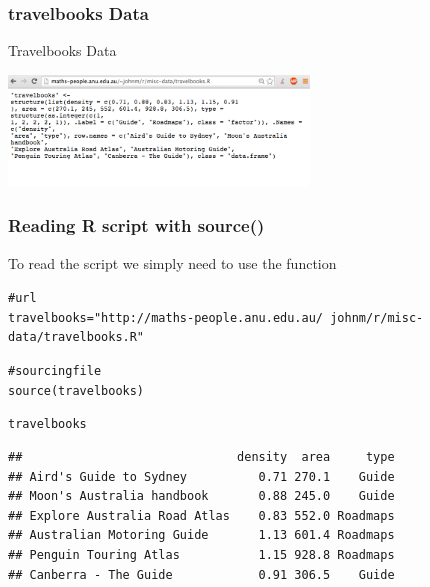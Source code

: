 \documentclass{beamer}\usepackage[]{graphicx}\usepackage[]{color}
\makeatletter
\newcommand{\hlstr}[1]{\textcolor[rgb]{0.063,0.58,0.627}{#1}}%
\newcommand{\hlcom}[1]{\textcolor[rgb]{0.588,0.588,0.588}{#1}}%
\newcommand{\hlstd}[1]{\textcolor[rgb]{0.196,0.196,0.196}{#1}}%
\newcommand{\hlkwb}[1]{\textcolor[rgb]{0.627,0,0.314}{#1}}%
\newcommand{\hlkwd}[1]{\textcolor[rgb]{0.78,0.227,0.412}{#1}}%
\newenvironment{kframe}{%
 \def\at@end@of@kframe{}%
 \ifinner\ifhmode%
  \def\at@end@of@kframe{\end{minipage}}%
  \begin{minipage}{\columnwidth}%
 \fi\fi%
 \def\FrameCommand##1{\hskip\@totalleftmargin \hskip-\fboxsep
 \colorbox{shadecolor}{##1}\hskip-\fboxsep
     \hskip-\linewidth \hskip-\@totalleftmargin \hskip\columnwidth}%
 \MakeFramed {\advance\hsize-\width
   \@totalleftmargin\z@ \linewidth\hsize
   \@setminipage}}%
 {\par\unskip\endMakeFramed%
 \at@end@of@kframe}
\newenvironment{knitrout}{}{} %
\makeatother
\begin{document}

\begin{frame}
\frametitle{travelbooks Data}

Travelbooks Data 
\begin{center}
\includegraphics[width=8cm]{images/travelbooks_data.png}
\end{center}

\end{frame}


\begin{frame}[fragile]
\frametitle{Reading R script with source()}

To read the script we simply need to use the function 
\begin{knitrout}\tiny
{}\color{fgcolor}\begin{kframe}
\begin{alltt}
\hlcom{# url}
\hlstd{travelbooks} \hlkwb{=} \hlstr{"http://maths-people.anu.edu.au/~johnm/r/misc-data/travelbooks.R"}

\hlcom{# sourcing file}
\hlkwd{source}\hlstd{(travelbooks)}
\end{alltt}
\end{kframe}
\end{knitrout}

\begin{knitrout}\tiny
{}\color{fgcolor}\begin{kframe}
\begin{alltt}
\hlstd{travelbooks}
\end{alltt}
\begin{verbatim}
##                              density  area     type
## Aird's Guide to Sydney          0.71 270.1    Guide
## Moon's Australia handbook       0.88 245.0    Guide
## Explore Australia Road Atlas    0.83 552.0 Roadmaps
## Australian Motoring Guide       1.13 601.4 Roadmaps
## Penguin Touring Atlas           1.15 928.8 Roadmaps
## Canberra - The Guide            0.91 306.5    Guide
\end{verbatim}
\end{kframe}
\end{knitrout}

\end{frame}
\end{document}
